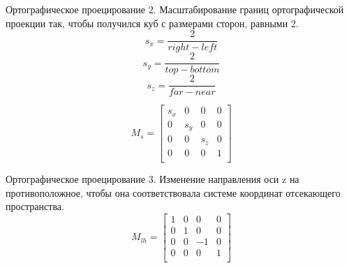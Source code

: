 \documentclass{beamer}
\begin{document}
	\begin{frame}{Ортографическое проецирование}
		2. Масштабирование границ ортографической проекции так, чтобы получился куб с размерами сторон, равными 2.
		\[
			s_x = \frac{2}{right - left}
		\]
		\[
			s_y = \frac{2}{top - bottom}
		\]
		\[
			s_z =  \frac{2}{far - near}
		\]

		\[
			M_s = 
			\begin{bmatrix}
				s_x & 0 & 0 & 0 \\
				0 & s_y & 0 & 0 \\
				0 & 0 & s_z & 0 \\
				0 & 0 & 0 & 1 \\
			\end{bmatrix}	
		\]
	\end{frame}	

	\begin{frame}{Ортографическое проецирование}
		3. Изменение направления оси z на противоположное, чтобы она соответствовала системе координат отсекающего пространства.
		\[
			M_{lh} = 
			\begin{bmatrix}
				1 & 0 & 0 & 0 \\
				0 & 1 & 0 & 0 \\
				0 & 0 & -1 & 0 \\
				0 & 0 & 0 & 1 \\
			\end{bmatrix}	
			\]
			
	\end{frame}
\end{document}
